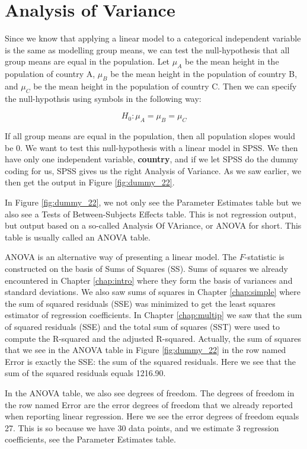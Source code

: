 \documentclass[]{book}\usepackage[]{graphicx}\usepackage[]{color}
\begin{document}
\section{Analysis of Variance}

Since we know that applying a linear model to a categorical independent variable is the same as modelling group means, we can test the null-hypothesis that all group means are equal in the population. Let $\mu_A$ be the mean height in the population of country A, $\mu_B$ be the mean height in the population of country B, and $\mu_C$ be the mean height in the population of country C. Then we can specify the null-hypothsis using symbols in the following way:

\begin{equation}
H_0: \mu_A= \mu_B=\mu_C
\end{equation}

If all group means are equal in the population, then all population slopes would be 0. We want to test this null-hypothesis with a linear model in SPSS. We then have only one independent variable, \textbf{country}, and if we let SPSS do the dummy coding for us, SPSS gives us the right Analysis of Variance. As we saw earlier, we then get the output in Figure \ref{fig:dummy_22}.

In Figure \ref{fig:dummy_22}, we not only see the Parameter Estimates table but we also see a Tests of Between-Subjects Effects table. This is not regression output, but output based on a so-called Analysis Of VAriance, or ANOVA for short. This table is usually called an ANOVA table. 

ANOVA is an alternative way of presenting a linear model. The $F$-statistic is constructed on the basis of Sums of Squares (SS). Sums of squares we already encountered in Chapter \ref{chap:intro} where they form the basis of variances and standard deviations. We also saw sums of squares in Chapter \ref{chap:simple} where the sum of squared residuals (SSE) was minimized to get the least squares estimator of regression coefficients. In Chapter \ref{chap:multip} we saw that the sum of squared residuals (SSE) and the total sum of squares (SST) were used to compute the R-squared and the adjusted R-squared. Actually, the sum of squares that we see in the ANOVA table in Figure \ref{fig:dummy_22} in the row named Error is exactly the SSE: the sum of the squared residuals. Here we see that the sum of the squared residuals equals 1216.90.

In the ANOVA table, we also see degrees of freedom. The degrees of freedom in the row named Error are the error degrees of freedom that we already reported when reporting linear regression. Here we see the error degrees of freedom equals 27. This is so because we have 30 data points, and we estimate 3 regression coefficients, see the Parameter Estimates table. 
\end{document}
